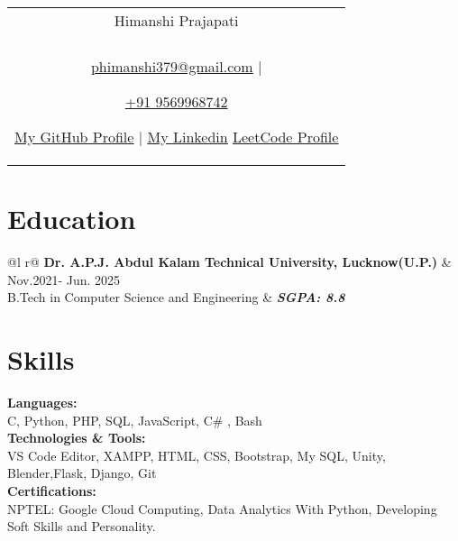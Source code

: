 \documentclass[a4paper,8pt]{article}
\begin{document}
\pagestyle{empty} 


\begin{tabularx}{\linewidth}{@{} C @{}}
\color[HTML]{1C033C} \Huge{Himanshi Prajapati} \\[4pt]
\\
\textcolor[HTML]{371e77}{\underline{\href{mailto:phimanshi379@gmail.com}{\raisebox{-0.05\height}{\faEnvelope} phimanshi379@gmail.com}} $|$}

\textcolor[HTML]{371e77}{\href{tel:+919569968742}{\raisebox{-0.05\height}{\faMobile} +91 9569968742}}

\textcolor[HTML]{371e77}{\underline{\href{https://github.com/Himanshiprajapati}{\raisebox{-0.05\height}{\faGithub} My GitHub Profile}} $|$}
\textcolor[HTML]{371e77}{\underline{\href{https://www.linkedin.com/in/himanshi-prajapati-b525b223b/}{\raisebox{-0.05\height}{\faLinkedin} My Linkedin}}}
\textcolor[HTML]{371e77}{\underline{\href{https://leetcode.com/u/Himanshiprajapati/}{\raisebox{-0.05\height}{\faleetcode} LeetCode Profile}}}
\end{tabularx}

\section{Education}
\begin{tabularx}{\linewidth}{ @{}l r@{} }
\color[HTML]{1C033C} \textbf{Dr. A.P.J. Abdul Kalam Technical University, Lucknow(U.P.)} & \hfill \color[HTML]{371e77}Nov.2021- Jun. 2025 \\
\color[HTML]{371e77} B.Tech in Computer Science and Engineering & \hfill \color[HTML]{4B28A4} \textit{\textbf{SGPA: 8.8}} \\
\end{tabularx}

\section{Skills}
\color[HTML]{1C033C}\textbf{Languages:} \\[2pt]
\color[HTML]{371e77} \hspace*{4ex} C, Python, PHP, SQL, JavaScript, C\#
, Bash \\[3pt]
\color[HTML]{1C033C}\textbf{Technologies \& Tools:} \\[2pt]
\color[HTML]{371e77} \hspace*{4ex} VS Code Editor, XAMPP, HTML, CSS, Bootstrap, My SQL, Unity, Blender,Flask, Django, Git\\[3pt]
\color[HTML]{1C033C}\textbf{Certifications:} \\[2pt]
\color[HTML]{371e77} \hspace*{4ex} {{NPTEL: Google Cloud Computing, Data Analytics With Python, Developing Soft Skills and Personality}}.
\end{document}
